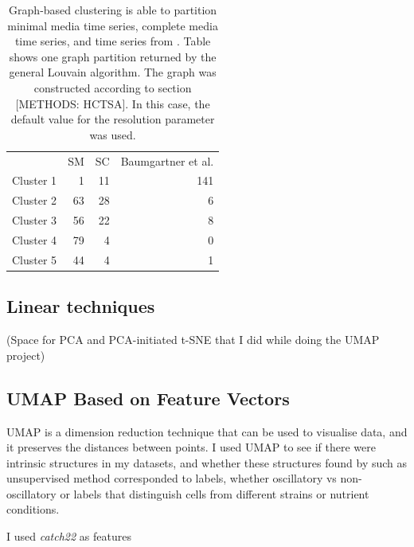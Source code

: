 \begin{table}[htbp]
  \centering
  \begin{tabular}[h]{rrrr}
    & SM & SC & Baumgartner et al.\\
    Cluster 1 & 1 & 11 & 141\\
    Cluster 2 & 63 & 28 & 6\\
    Cluster 3 & 56 & 22 & 8\\
    Cluster 4 & 79 & 4 & 0\\
    Cluster 5 & 44 & 4 & 1
  \end{tabular}
  \caption{Graph-based clustering is able to partition minimal media time series, complete media time series, and time series from \textcite{baumgartnerFlavinbasedMetabolicCycles2018}.  Table shows one graph partition returned by the general Louvain algorithm.  The graph was constructed according to section [METHODS: HCTSA].  In this case, the default value for the resolution parameter was used.}
  \label{tab:ClusterBaumgartner}
\end{table}

\subsection{Linear techniques}
\label{subsec:analysis-clustering-pca}

(Space for PCA and PCA-initiated t-SNE that I did while doing the UMAP project)

\subsection{UMAP Based on Feature Vectors}
\label{subsec:analysis-clustering-umap}

UMAP \parencite{mcinnesUMAPUniformManifold2020} is a dimension reduction technique that can be used to visualise data, and it preserves the distances between points.
I used UMAP to see if there were intrinsic structures in my datasets, and whether these structures found by such as unsupervised method corresponded to labels, whether oscillatory vs non-oscillatory or labels that distinguish cells from different strains or nutrient conditions.

I used \textit{catch22} as features


